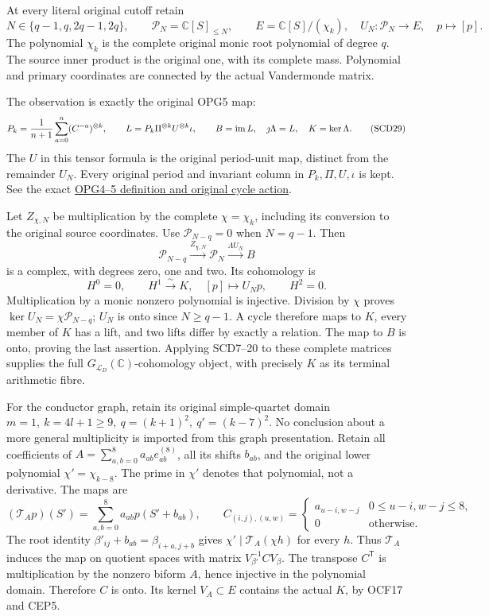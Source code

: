 \documentclass[11pt,a4paper]{article}
\theoremstyle{definition}\newtheorem{definition}[theorem]{Definition}
\newcommand{\C}{\mathbb C}\newcommand{\R}{\mathbb R}
\newcommand{\Pp}{\mathcal P}\newcommand{\LL}{\mathcal L}
\begin{document}
At every literal original cutoff retain
\[
 N\in\{q-1,q,2q-1,2q\},\qquad
 \Pp_N=\C[S]_{\le N},\qquad E=\C[S]/(\chi_k),
 \quad U_N:\Pp_N\to E,\quad p\mapsto[p].
 \tag{SCD28}
\]
The polynomial \(\chi_k\) is the complete original monic root
polynomial of degree \(q\). The source inner product is the original
one, with its complete mass. Polynomial and primary coordinates
are connected by the actual Vandermonde matrix.

The observation is exactly the original OPG5 map:
\[
 P_k=\frac1{n+1}\sum_{a=0}^{n}(C^{-a})^{\otimes k},\qquad
 L=P_k\Pi^{\otimes k}U^{\otimes k}\iota,\qquad
 B=\operatorname{im} L,\quad\jmath\Lambda=L,\quad K=\ker\Lambda .
 \tag{SCD29}
\]
The \(U\) in this tensor formula is the original period-unit map,
distinct from the remainder \(U_N\). Every original period and
invariant column in \(P_k,\Pi,U,\iota\) is kept. See the exact
\href{https://github.com/KokunoYumeto/zeta-function-research-reader/blob/6cf5b3aa8ff395eba6b5512b28d117334da5767b/workbenches/splitzero-tandem/continuations/20260922-cutoff-profile/RETAINED_COMPLETE_PROOF_SOURCES.tex#L9420}{OPG4--5 definition and original cycle action}.

Let \(Z_{\chi,N}\) be multiplication by the complete \(\chi=\chi_k\),
including its conversion to the original source coordinates.
Use \(\Pp_{N-q}=0\) when \(N=q-1\). Then
\[
 \Pp_{N-q}\xrightarrow{Z_{\chi,N}}\Pp_N
                  \xrightarrow{\Lambda U_N}B
 \tag{SCD30}
\]
is a complex, with degrees zero, one and two. Its cohomology is
\[
 H^0=0,\qquad
 H^1\xrightarrow{\sim}K,\quad[p]\mapsto U_Np,\qquad H^2=0.
 \tag{SCD31}
\]
Multiplication by a monic nonzero polynomial is injective.
Division by \(\chi\) proves
\(\ker U_N=\chi\Pp_{N-q}\); \(U_N\) is onto since \(N\ge q-1\).
A cycle therefore maps to \(K\), every member of \(K\) has a lift,
and two lifts differ by exactly a relation. The map to \(B\)
is onto, proving the last assertion. Applying SCD7--20 to these
complete matrices supplies the full \(G_{\LL_D}(\C)\)-cohomology
object, with precisely \(K\) as its terminal arithmetic fibre.

For the conductor graph, retain its original simple-quartet domain
\(m=1,\ k=4l+1\ge9,\ q=(k+1)^2,\ q'=(k-7)^2\).
No conclusion about a more general multiplicity is imported from
this graph presentation. Retain all coefficients of
\(A=\sum_{a,b=0}^8a_{ab}e_{ab}^{(8)}\), all its shifts \(b_{ab}\),
and the original lower polynomial \(\chi'=\chi_{k-8}\). The prime
in \(\chi'\) denotes that polynomial, not a derivative. The maps are
\[
 (\mathcal T_Ap)(S')=\sum_{a,b=0}^8a_{ab}p(S'+b_{ab}),\qquad
 C_{(i,j),(u,w)}=
 \begin{cases}a_{u-i,w-j}&0\le u-i,w-j\le8,\\
 0&\text{otherwise}.
 \end{cases}
 \tag{SCD32}
\]
The root identity \(\beta'_{ij}+b_{ab}=\beta_{i+a,j+b}\)
gives \(\chi'\mid\mathcal T_A(\chi h)\) for every \(h\).
Thus \(\mathcal T_A\) induces the map on quotient spaces with
matrix \(V_{\beta'}^{-1}CV_\beta\). The transpose \(C^{\mathsf T}\)
is multiplication by the nonzero biform \(A\), hence injective
in the polynomial domain. Therefore \(C\) is onto. Its kernel
\(V_A\subset E\) contains the actual \(K\), by OCF17 and CEP5.
\end{document}
